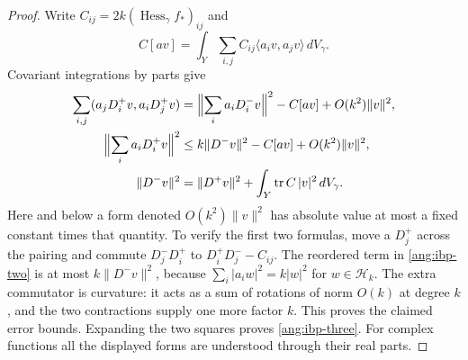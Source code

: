 \begin{proof}
Write $C_{ij}=2k(\operatorname{Hess}_\gamma f_*)_{ij}$ and
\[
 C[av]=\int_Y\sum_{i,j}C_{ij}\langle a_iv,a_jv\rangle\,dV_\gamma.
\]
Covariant integrations by parts give
\begin{align}
 \sum_{i,j}(a_jD_i^+v,a_iD_j^+v)
   &=\Bigl\|\sum_i a_iD_i^-v\Bigr\|^2-C[av]
                                    +O(k^2)\|v\|^2,\label{ang:ibp-one}\\
 \Bigl\|\sum_i a_iD_i^+v\Bigr\|^2
   &\le k\|D^-v\|^2-C[av]+O(k^2)\|v\|^2,\label{ang:ibp-two}\\
 \|D^-v\|^2
   &=\|D^+v\|^2+\int_Y\operatorname{tr} C\,|v|^2\,dV_\gamma.
                                                    \label{ang:ibp-three}
\end{align}
Here and below a form denoted $O(k^2)\|v\|^2$ has absolute value at most
a fixed constant times that quantity.  To verify the first two formulas,
move a $D_j^+$ across the pairing and commute
$D_j^-D_i^+$ to $D_i^+D_j^--C_{ij}$.  The reordered term in
\eqref{ang:ibp-two} is at most $k\|D^-v\|^2$, because
$\sum_i|a_iw|^2=k|w|^2$ for $w\in\mathcal H_k$.
The extra commutator is curvature: it acts as a sum of rotations of norm
$O(k)$ at degree $k$, and the two contractions supply one more factor $k$.
This proves the claimed error bounds.  Expanding the two squares proves
\eqref{ang:ibp-three}.  For complex functions all the displayed forms
are understood through their real parts.


\end{proof}
